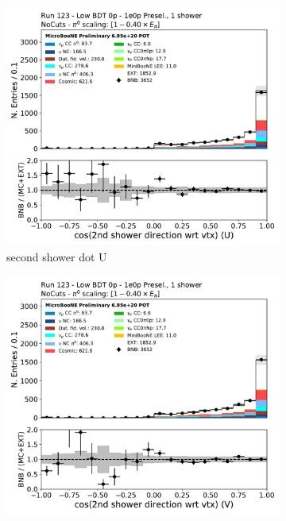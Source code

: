 \begin{figure}[H]
    \centering
    \begin{subfigure}{0.3\textwidth}
    \includegraphics[width=1.0\textwidth]{1e0p/Low_BDT_Sideband/secondshower_U_dot.pdf}
    \caption{second shower dot U}
    \end{subfigure}
    \begin{subfigure}{0.3\textwidth}
    \includegraphics[width=1.0\textwidth]{1e0p/Low_BDT_Sideband/secondshower_V_dot.pdf}

\end{subfigure}
\end{figure}
